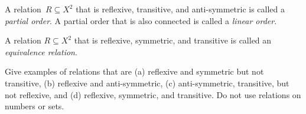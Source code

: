 \documentclass[../../include/open-logic-section]{subfiles}
\begin{document}
\begin{defn}
A relation~$R \subseteq X^2$ that is reflexive, transitive, and
anti-symmetric is called a \emph{partial order}.  A partial order that
is also connected is called a \emph{linear order}.
\end{defn}

\begin{defn}
A relation $R \subseteq X^2$ that is reflexive, symmetric, and
transitive is called an \emph{equivalence relation}.
\end{defn}

\begin{prob}
Give examples of relations that are (a) reflexive and symmetric but
not transitive, (b) reflexive and anti-symmetric, (c) anti-symmetric,
transitive, but not reflexive, and (d) reflexive, symmetric, and
transitive.  Do not use relations on numbers or sets.
\end{prob}
\end{document}
